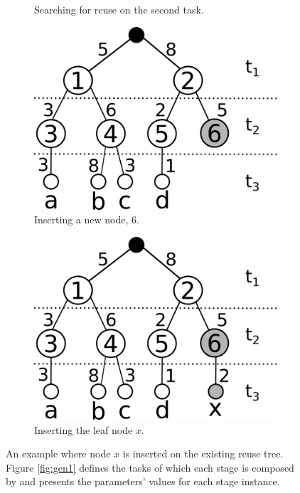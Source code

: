 \begin{figure}[h]
\begin{subfigure}[b]{0.3\textwidth}
			 \centering
			 \caption{Searching for reuse on the second task.}
			 \label{fig:gen4}
	 \end{subfigure}
	 \hspace{3mm}
	 \begin{subfigure}[b]{0.3\textwidth}
			 \includegraphics[width=\textwidth]{img/gen5.png}
			 \caption{Inserting a new node, 6.}
			 \label{fig:gen5}
	 \end{subfigure}
	 \hspace{3mm}
	 \begin{subfigure}[b]{0.3\textwidth}
			 \includegraphics[width=\textwidth]{img/gen6.png}
			 \caption{Inserting the leaf node $x$.}
			 \label{fig:gen6}
	 \end{subfigure}
	 
		\caption{An example where node $x$ is inserted on the existing reuse tree. Figure \ref{fig:gen1} defines the tasks of which each stage is composed by and presents the parameters' values for each stage instance.}
		\label{fig:gen-ex}
\end{figure}

